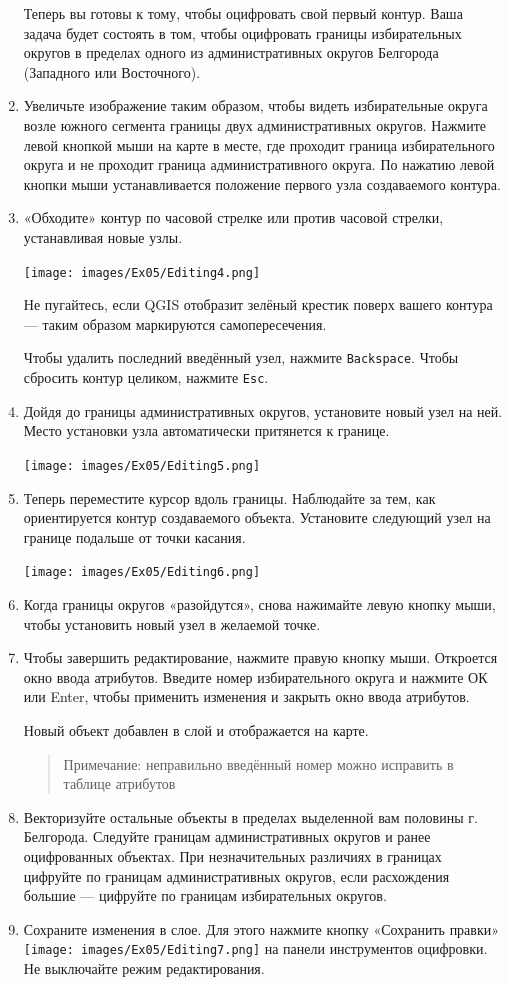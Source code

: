 \documentclass[
  12pt,
]{book}
\begin{document}
\begin{enumerate}
  Теперь вы готовы к тому, чтобы оцифровать свой первый контур. Ваша задача будет состоять в том, чтобы оцифровать границы избирательных округов в пределах одного из административных округов Белгорода (Западного или Восточного).
\item
  Увеличьте изображение таким образом, чтобы видеть избирательные округа возле южного сегмента границы двух административных округов. Нажмите левой кнопкой мыши на карте в месте, где проходит граница избирательного округа и не проходит граница административного округа. По нажатию левой кнопки мыши устанавливается положение первого узла создаваемого контура.
\item
  «Обходите» контур по часовой стрелке или против часовой стрелки, устанавливая новые узлы.

  \texttt{[image: images/Ex05/Editing4.png]}

  Не пугайтесь, если QGIS отобразит зелёный крестик поверх вашего контура --- таким образом маркируются самопересечения.

  Чтобы удалить последний введённый узел, нажмите \texttt{Backspace}. Чтобы сбросить контур целиком, нажмите \texttt{Esc}.
\item
  Дойдя до границы административных округов, установите новый узел на ней. Место установки узла автоматически притянется к границе.

  \texttt{[image: images/Ex05/Editing5.png]}
\item
  Теперь переместите курсор вдоль границы. Наблюдайте за тем, как ориентируется контур создаваемого объекта. Установите следующий узел на границе подальше от точки касания.

  \texttt{[image: images/Ex05/Editing6.png]}
\item
  Когда границы округов «разойдутся», снова нажимайте левую кнопку мыши, чтобы установить новый узел в желаемой точке.
\item
  Чтобы завершить редактирование, нажмите правую кнопку мыши. Откроется окно ввода атрибутов. Введите номер избирательного округа и нажмите ОК или Enter, чтобы применить изменения и закрыть окно ввода атрибутов.

  Новый объект добавлен в слой и отображается на карте.

  \begin{quote}
  Примечание: неправильно введённый номер можно исправить в таблице атрибутов
  \end{quote}
\item
  Векторизуйте остальные объекты в пределах выделенной вам половины г. Белгорода. Следуйте границам административных округов и ранее оцифрованных объектах. При незначительных различиях в границах цифруйте по границам административных округов, если расхождения большие --- цифруйте по границам избирательных округов.
\item
  Сохраните изменения в слое. Для этого нажмите кнопку «Сохранить правки» \texttt{[image: images/Ex05/Editing7.png]} на панели инструментов оцифровки. Не выключайте режим редактирования.


\end{enumerate}
\end{document}
